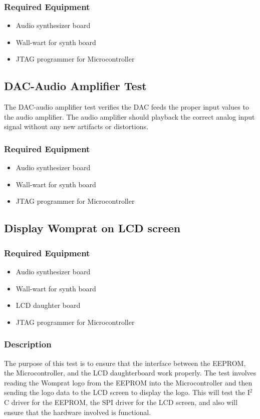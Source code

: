 \documentclass{article}
\begin{document}
\subsubsection{Required Equipment}
\begin{itemize}
\item Audio synthesizer board
\item Wall-wart for synth board
\item JTAG programmer for Microcontroller
\end{itemize}

\subsection{DAC-Audio Amplifier Test}
The DAC-audio amplifier test verifies the DAC feeds the proper input values to the audio amplifier.  The audio amplifier should playback the correct analog input signal without any new artifacts or distortions.
\subsubsection{Required Equipment}
\begin{itemize}
\item Audio synthesizer board
\item Wall-wart for synth board
\item JTAG programmer for Microcontroller
\end{itemize}

\subsection{Display Womprat on LCD screen}
\subsubsection{Required Equipment}
\begin{itemize}
\item Audio synthesizer board
\item Wall-wart for synth board
\item LCD daughter board
\item JTAG programmer for Microcontroller
\end{itemize}
\subsubsection{Description}
The purpose of this test is to ensure that the interface between the EEPROM, the Microcontroller, and the LCD daughterboard work properly. The test involves reading the Womprat logo from the EEPROM into the Microcontroller and then sending the logo data to the LCD screen to display the logo. This will test the I$^2$C driver for the EEPROM, the SPI driver for the LCD screen, and also will ensure that the hardware involved is functional.
\end{document}
